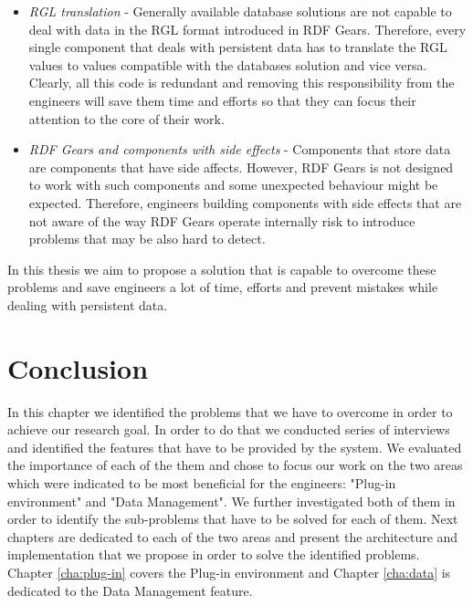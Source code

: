 \begin{itemize}
	\item \textit{RGL translation} - Generally available database solutions are not capable to deal with data in the RGL format introduced in RDF Gears. Therefore, every single component that deals with persistent data has to translate the RGL values to values compatible with the databases solution and vice versa. Clearly, all this code is redundant and removing this responsibility from the engineers will save them time and efforts so that they can focus their attention to the core of their work.
	
	\item \textit{RDF Gears and components with side effects} - Components that store data are components that have side affects. However, RDF Gears is not designed to work with such components and some unexpected behaviour might be expected. Therefore, engineers building components with side effects that are not aware of the way RDF Gears operate internally risk to introduce problems that may be also hard to detect.
	
\end{itemize}

In this thesis we aim to propose a solution that is capable to overcome these problems and save engineers a lot of time, efforts and prevent mistakes while dealing with persistent data.

\section{Conclusion}

In this chapter we identified the problems that we have to overcome in order to achieve our research goal. In order to do that we conducted series of interviews and identified the features that have to be provided by the system. We evaluated the importance of each of the them and chose to focus our work on the two areas which were indicated to be most beneficial for the engineers: "Plug-in environment" and "Data Management". We further investigated both of them in order to identify the sub-problems that have to be solved for each of them. Next chapters are dedicated to each of the two areas and present the architecture and implementation that we propose in order to solve the identified problems. Chapter \ref{cha:plug-in} covers the Plug-in environment and Chapter \ref{cha:data} is dedicated to the Data Management feature.